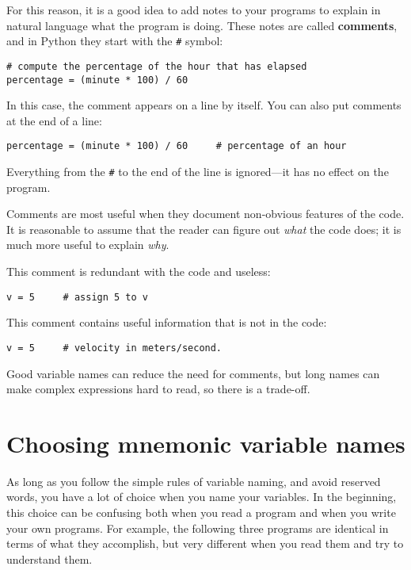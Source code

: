 For this reason, it is a good idea to add notes to your programs to explain
in natural language what the program is doing.  These notes are called
{\bf comments}, and in Python they start with the \verb"#" symbol:

\beforeverb
\begin{verbatim}
# compute the percentage of the hour that has elapsed
percentage = (minute * 100) / 60
\end{verbatim}
\afterverb
%
In this case, the comment appears on a line by itself.  You can also put
comments at the end of a line:

\beforeverb
\begin{verbatim}
percentage = (minute * 100) / 60     # percentage of an hour
\end{verbatim}
\afterverb
%
Everything from the {\tt \#} to the end of the line is ignored---it
has no effect on the program.

Comments are most useful when they document non-obvious features of
the code.  It is reasonable to assume that the reader can figure out
\emph{what} the code does; it is much more useful to explain \emph{why}.

This comment is redundant with the code and useless:

\beforeverb
\begin{verbatim}
v = 5     # assign 5 to v
\end{verbatim}
\afterverb
%
This comment contains useful information that is not in the code:

\beforeverb
\begin{verbatim}
v = 5     # velocity in meters/second. 
\end{verbatim}
\afterverb
%
Good variable names can reduce the need for comments, but
long names can make complex expressions hard to read, so there is
a trade-off.

\section{Choosing mnemonic variable names}


As long as you follow the simple rules of variable naming, and avoid
reserved words, you have a lot of choice when you name your variables.
In the beginning, this choice can be confusing both when you read a 
program and when you write your own programs.  For example, the
following three programs are identical in terms of what they accomplish,
but very different when you read them and try to understand them.

